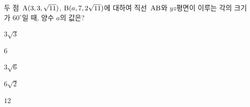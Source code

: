 두 점~$\mathrm{A}(3{,}\mkern3mu\mathopen{}3{,}\mkern3mu\mathopen{}\sqrt{11})$, $\mathrm{B}(a{,}\mkern3mu\mathopen{}7{,}\mkern3mu\mathopen{}2\sqrt{11})$에 대하여 직선~$\mathrm{AB}$와 $yz$평면이 이루는 각의 크기가 $60^\circ$일 때, 양수 $a$의 값은?
\begin{choices32}{\rule[-3ex]{0pt}{8ex}$3\sqrt{3}$}{\rule[-3ex]{0pt}{8ex}$6$}{\rule[-3ex]{0pt}{8ex}$3\sqrt{6}$}{\rule[-3ex]{0pt}{8ex}$6\sqrt{2}$}{\rule[-3ex]{0pt}{8ex}$12$}\end{choices32}
